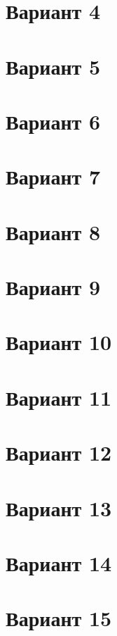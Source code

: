 \documentclass[12pt]{article}
\begin{document}
\section{Вариант 4}

\section{Вариант 5}

\section{Вариант 6}

\section{Вариант 7}

\section{Вариант 8}

\section{Вариант 9}

\section{Вариант 10}

\section{Вариант 11}

\section{Вариант 12}

\section{Вариант 13}

\section{Вариант 14}

\section{Вариант 15}
\end{document}
